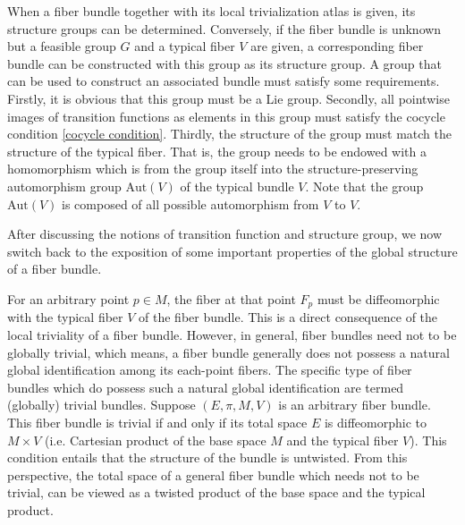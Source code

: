 \par When a fiber bundle together with its local trivialization atlas is given, its structure groups can be determined. Conversely, if the fiber bundle is unknown but a feasible group $G$ and a typical fiber $V$ are given, a corresponding fiber bundle can be constructed with this group as its structure group. A group that can be used to construct an associated bundle must satisfy some requirements. Firstly, it is obvious that this group must be a Lie group. Secondly, all pointwise images of transition functions as elements in this group must satisfy the cocycle condition \eqref{cocycle condition}. Thirdly, the structure of the group must match the structure of the typical fiber. That is, the group needs to be endowed with a homomorphism which is from the group itself into the structure-preserving automorphism group $\mathrm{Aut}\left(V\right)$ of the typical bundle $V$. Note that the group $\mathrm{Aut}\left(V\right)$ is composed of all possible automorphism from $V$ to $V$.
\par After discussing the notions of transition function and structure group, we now switch back to the exposition of some important properties of the global structure of a fiber bundle. 
\par For an arbitrary point $p\in M$, the fiber at that point $F_{p}$ must be diffeomorphic with the typical fiber $V$ of the fiber bundle. This is a direct consequence of the local triviality of a fiber bundle. However, in general, fiber bundles need not to be globally trivial, which means, a fiber bundle generally does not possess a natural global identification among its each-point fibers. The specific type of fiber bundles which do possess such a natural global identification are termed (globally) trivial bundles. Suppose $\left(E,\pi,M,V\right)$ is an arbitrary fiber bundle. This fiber bundle is trivial if and only if its total space $E$ is diffeomorphic to $M\times V$ (i.e. Cartesian product of the base space $M$ and the typical fiber $V$). This condition entails that the structure of the bundle is untwisted. From this perspective, the total space of a general fiber bundle which needs not to be trivial, can be viewed as a twisted product of the base space and the typical product. 
